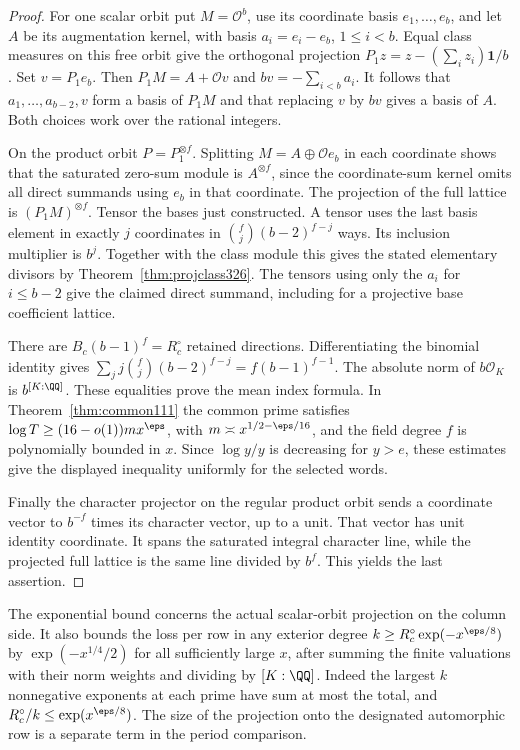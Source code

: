 \documentclass[a4paper,11pt]{article}
\theoremstyle{definition}
\theoremstyle{remark}
\numberwithin{equation}{section}
\begin{document}
\begin{proof}
For one scalar orbit put \(M=\mathcal O^b\), use its
coordinate basis \(e_1,\ldots,e_b\), and let \(A\) be its
augmentation kernel, with basis \(a_i=e_i-e_b\), \(1\le i<b\).
Equal class measures on this free orbit give the orthogonal
projection \(P_1 z=z-(\sum_i z_i)\mathbf 1/b\).
Set \(v=P_1e_b\). Then \(P_1M=A+\mathcal O v\) and
\(b v=-\sum_{i<b}a_i\). It follows that
\(a_1,\ldots,a_{b-2},v\) form a basis of \(P_1M\) and that
replacing \(v\) by \(b v\) gives a basis of \(A\).
Both choices work over the rational integers.

On the product orbit \(P=P_1^{\otimes f}\). Splitting
\(M=A\oplus\mathcal O e_b\) in each coordinate shows that
the saturated zero-sum module is \(A^{\otimes f}\), since
the coordinate-sum kernel omits all direct summands using
\(e_b\) in that coordinate. The projection of the full
lattice is \((P_1M)^{\otimes f}\). Tensor the bases just
constructed. A tensor uses the last basis element in
exactly \(j\) coordinates in
\(\binom fj(b-2)^{f-j}\) ways. Its inclusion multiplier
is \(b^j\). Together with the class module this gives the
stated elementary divisors by Theorem~\ref{thm:projclass326}.
The tensors using only the \(a_i\) for \(i\le b-2\) give
the claimed direct summand, including for a projective
base coefficient lattice.

There are \(B_c(b-1)^f=R_c^\circ\) retained directions.
Differentiating the binomial identity gives
\(\sum_j j\binom fj(b-2)^{f-j}=f(b-1)^{f-1}\).
The absolute norm of \(b\mathcal O_K\) is \(b^{[K:\QQ]}\).
These equalities prove the mean index formula.
In Theorem~\ref{thm:common111} the common prime satisfies
\(\log T\ge(16-o(1))m x^\eps\), with
\(m\asymp x^{1/2-\eps/16}\), and the field degree \(f\)
is polynomially bounded in \(x\). Since \(\log y/y\)
is decreasing for \(y>e\), these estimates give the
displayed inequality uniformly for the selected words.

Finally the character projector on the regular product
orbit sends a coordinate vector to \(b^{-f}\) times its
character vector, up to a unit. That vector has unit
identity coordinate. It spans the saturated integral
character line, while the projected full lattice is the
same line divided by \(b^f\). This yields the last assertion.
\end{proof}

The exponential bound concerns the actual scalar-orbit
projection on the column side. It also bounds the loss
per row in any exterior degree \(k\ge
R_c^\circ\exp(-x^{\eps/8})\) by
\(\exp(-x^{1/4}/2)\) for all sufficiently large \(x\),
after summing the finite valuations with their norm weights
and dividing by \([K:\QQ]\). Indeed the largest \(k\)
nonnegative exponents at each prime have sum at most the
total, and \(R_c^\circ/k\le\exp(x^{\eps/8})\).
The size of the projection
onto the designated automorphic row is a separate term in
the period comparison.
\end{document}
